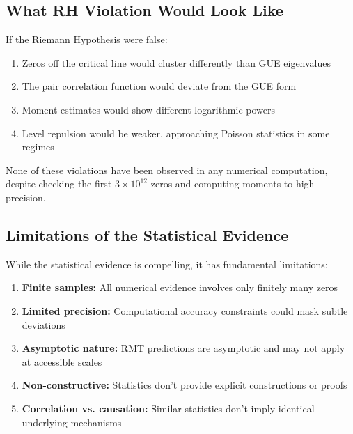\subsection{What RH Violation Would Look Like}

\begin{theorem}
\label{thm:rh_violation_signatures}
If the Riemann Hypothesis were false:
\begin{enumerate}[label=(\alph*)]
\item Zeros off the critical line would cluster differently than GUE eigenvalues
\item The pair correlation function would deviate from the GUE form
\item Moment estimates would show different logarithmic powers
\item Level repulsion would be weaker, approaching Poisson statistics in some regimes
\end{enumerate}
\end{theorem}

\begin{remark}
None of these violations have been observed in any numerical computation, despite checking the first $3 \times 10^{12}$ zeros and computing moments to high precision.
\end{remark}

\subsection{Limitations of the Statistical Evidence}

\begin{important}
While the statistical evidence is compelling, it has fundamental limitations:
\begin{enumerate}
\item \textbf{Finite samples:} All numerical evidence involves only finitely many zeros
\item \textbf{Limited precision:} Computational accuracy constraints could mask subtle deviations
\item \textbf{Asymptotic nature:} RMT predictions are asymptotic and may not apply at accessible scales
\item \textbf{Non-constructive:} Statistics don't provide explicit constructions or proofs
\item \textbf{Correlation vs. causation:} Similar statistics don't imply identical underlying mechanisms
\end{enumerate}
\end{important}

